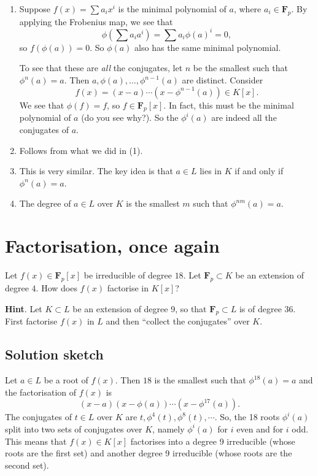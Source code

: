 \documentclass[12pt]{amsart}
\begin{document}
\begin{enumerate}
\item Suppose \(f(x) = \sum a_i x^i\) is the minimal polynomial of \(a\), where \(a_i \in \mathbf{F}_p\).
By applying the Frobenius map, we see that
\[ \phi(\sum a_i a^i) = \sum a_{i} \phi(a)^i = 0,\]
so \(f(\phi(a)) = 0\).
So \(\phi(a)\) also has the same minimal polynomial.

To see that these are \emph{all} the conjugates, let \(n\) be the smallest such that \(\phi^n(a) = a\).
Then \(a, \phi(a), \dots, \phi^{n-1}(a)\) are distinct.
Consider
\[ f(x) = (x-a) \cdots (x-\phi^{n-1}(a)) \in K[x].\]
We see that \(\phi(f) = f\), so \(f \in \mathbf{F}_p[x]\).
In fact, this must be the minimal polynomial of \(a\) (do you see why?).
So the \(\phi^{i}(a)\) are indeed all the conjugates of \(a\).

\item Follows from what we did in (1).

\item This is very similar.  The key idea is that \(a \in L\) lies in \(K\) if and only if \(\phi^n(a) = a\).

\item The degree of \(a \in L\) over \(K\) is the smallest \(m\) such that \(\phi^{nm}(a) = a\).
\end{enumerate}
\section{Factorisation, once again}
\label{sec:org3fbba91}

Let \(f(x) \in \mathbf{F}_p[x]\) be irreducible of degree \(18\).
Let \(\mathbf{F}_p \subset K\) be an extension of degree \(4\).
How does \(f(x)\) factorise in \(K[x]\)?

\noindent
\textbf{Hint}.  Let \(K \subset L\) be an extension of degree 9, so that \(\mathbf{F}_p \subset L\) is of degree 36.  First factorise \(f(x)\) in \(L\) and then ``collect the conjugates'' over \(K\).
\subsection{Solution sketch}
\label{sec:org0327c8b}

Let \(a \in L\) be a root of \(f(x)\).
Then \(18\) is the smallest such that \(\phi^{18}(a) = a\) and the factorisation of \(f(x)\) is
\[ (x-a)(x-\phi(a))\cdots(x-\phi^{17}(a)).\]
The conjugates of \(t \in L\) over \(K\) are \(t, \phi^{4}(t), \phi^{8}(t), \cdots\).
So, the 18 roots \(\phi^i(a)\) split into two sets of conjugates over \(K\), namely \(\phi^i(a)\) for \(i\) even and for \(i\) odd.
This means that \(f(x) \in K[x]\) factorises into a degree 9 irreducible (whose roots are the first set) and another degree 9 irreducible (whose roots are the second set).
\end{document}
